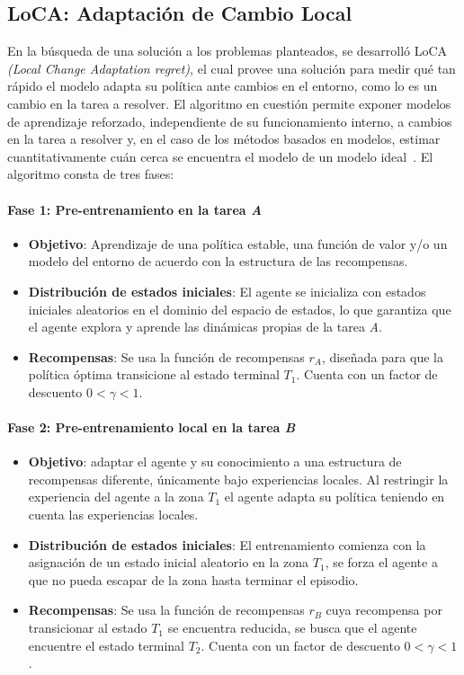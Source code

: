 \subsection{LoCA: Adaptación de Cambio Local}\label{subsec:loca-adaptacion-de-cambio-local}
En la búsqueda de una solución a los problemas planteados, se desarrolló LoCA \textit{(Local Change Adaptation regret)}, el cual provee una solución para medir qué tan rápido el modelo adapta su política ante cambios en el entorno, como lo es un cambio en la tarea a resolver.
El algoritmo en cuestión permite exponer modelos de aprendizaje reforzado, independiente de su funcionamiento interno, a cambios en la tarea a resolver y, en el caso de los métodos basados en modelos, estimar cuantitativamente cuán cerca se encuentra el modelo de un modelo ideal~\cite{LOCA_2020}.
El algoritmo consta de tres fases:

\paragraph{Fase 1: Pre-entrenamiento en la tarea \textit{A}}
\begin{itemize}
    \item \textbf{Objetivo}: Aprendizaje de una política estable, una función de valor y/o un modelo del entorno de acuerdo con la estructura de las recompensas.
    \item \textbf{Distribución de estados iniciales}: El agente se inicializa con estados iniciales aleatorios en el dominio del espacio de estados, lo que garantiza que el agente explora y aprende las dinámicas propias de la tarea \textit{A}.
    \item \textbf{Recompensas}: Se usa la función de recompensas $r_A$, diseñada para que la política óptima transicione al estado terminal $T_1$. Cuenta con un factor de descuento $0 < \gamma < 1$.
\end{itemize}

\paragraph{Fase 2: Pre-entrenamiento local en la tarea \textit{B}}
\begin{itemize}
    \item \textbf{Objetivo}: adaptar el agente y su conocimiento a una estructura de recompensas diferente, únicamente bajo experiencias locales. Al restringir la experiencia del agente a la zona $T_1$ el agente adapta su política teniendo en cuenta las experiencias locales.
    \item \textbf{Distribución de estados iniciales}: El entrenamiento comienza con la asignación de un estado inicial aleatorio en la zona $T_1$, se forza el agente a que no pueda escapar de la zona hasta terminar el episodio.
    \item \textbf{Recompensas}: Se usa la función de recompensas $r_B$ cuya recompensa por transicionar al estado $T_1$ se encuentra reducida, se busca que el agente encuentre el estado terminal $T_2$. Cuenta con un factor de descuento $0 < \gamma < 1$.
\end{itemize}

